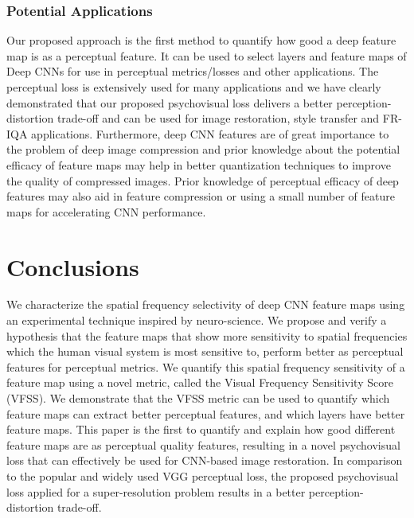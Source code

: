 \documentclass[10pt,twocolumn,letterpaper]{article}
\begin{document}
\subsubsection{Potential Applications}
Our proposed approach is the first method to quantify how good a deep feature map is as a perceptual feature. It can be used to select layers and feature maps of Deep CNNs for use in perceptual metrics/losses and other applications. The perceptual loss is extensively used for many applications and we have clearly demonstrated that our proposed psychovisual loss delivers a better perception-distortion trade-off and can be used for image restoration, style transfer and FR-IQA applications. Furthermore, deep CNN features are of great importance to the problem of deep image compression and prior knowledge about the potential efficacy of feature maps may help in better quantization techniques to improve the quality of compressed images. Prior knowledge of perceptual efficacy of deep features may also aid in feature compression or using a small number of feature maps for accelerating CNN performance.

\section{Conclusions}
We characterize the spatial frequency selectivity of deep CNN feature maps using an experimental technique inspired by neuro-science. We propose and verify a hypothesis that the feature maps that show more sensitivity to spatial frequencies which the human visual system is most sensitive to, perform better as perceptual features for perceptual metrics. We quantify this spatial frequency sensitivity of a feature map using a novel metric, called the Visual Frequency Sensitivity Score (VFSS). We demonstrate that the VFSS metric can be used to quantify which feature maps can extract better perceptual features, and which layers have better feature maps. This paper is the first to quantify and explain how good different feature maps are as perceptual quality features, resulting in a novel psychovisual loss that can effectively be used for CNN-based image restoration. In comparison to the popular and widely used VGG perceptual loss, the proposed psychovisual loss applied for a super-resolution problem results in a better perception-distortion trade-off. 
   

  
   
\end{document}
